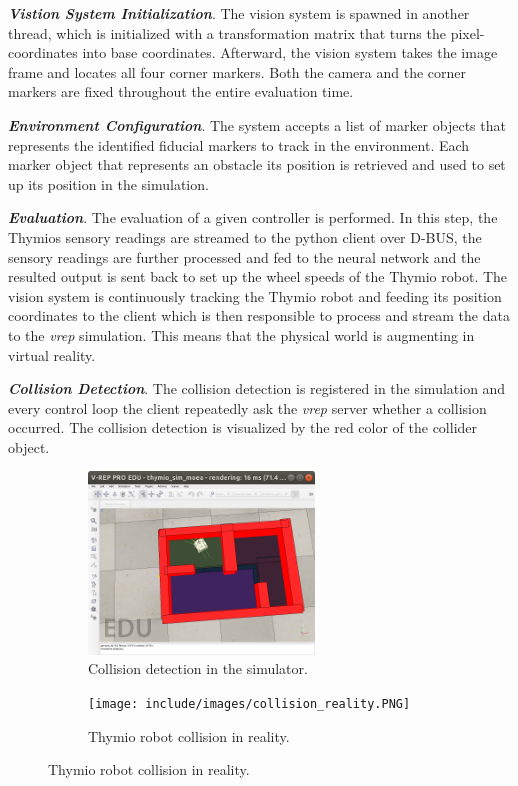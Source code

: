 \textbf{\emph{Vistion System Initialization}}. The vision system is spawned in another thread, which is initialized with a transformation matrix that turns the pixel-coordinates into base coordinates. Afterward, the vision system takes the image frame and locates all four corner markers. Both the camera and the corner markers are fixed throughout the entire evaluation time.

\textbf{\emph{Environment Configuration}}. The system accepts a list of marker objects that represents the identified fiducial markers to track in the environment. Each marker object that represents an obstacle its position is retrieved and used to set up its position in the simulation.

\textbf{\emph{Evaluation}}. The evaluation of a given controller is performed. In this step, the Thymios sensory readings are streamed to the python client over D-BUS, the sensory readings are further processed and fed to the neural network and the resulted output is sent back to set up the wheel speeds of the Thymio robot. The vision system is continuously tracking the Thymio robot and feeding its position coordinates to the client which is then responsible to process and stream the data to the \emph{vrep} simulation. This means that the physical world is augmenting in virtual reality.

\textbf{\emph{Collision Detection}}. The collision detection is registered in the simulation and every control loop the client repeatedly ask the \emph{vrep} server whether a collision occurred. The collision detection is visualized by the red color of the collider object.

\begin{figure}[H]
    \centering
    \begin{subfigure}[b]{0.4\textwidth}
    	\centering
        \includegraphics[width=6cm]{include/images/collision.PNG}
        \caption{Collision detection in the simulator.}
        \label{fig:thymio_collision_sim}
    \end{subfigure}
    \begin{subfigure}[b]{0.4\textwidth}
    	\centering
        \texttt{[image: include/images/collision\_reality.PNG]}
        \caption{Thymio robot collision in reality.}
        \label{fig:thymio_collision_reality}
    \end{subfigure}
\end{figure}

